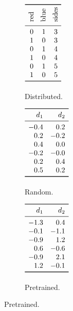 \documentclass{article}
\begin{document}
{\begin{figure}[t!]
\begin{subfigure}[t]{0.25\textwidth}
    \label{fig:reps:localist}
  \end{subfigure}
  \hfill
  \begin{subfigure}[t]{0.14\textwidth}
    \centering
    \renewcommand{\arraystretch}{1.24}
    $\begin{array}[b]{*{3}{r}}
       \toprule
       \rotatebox{90}{red} & \rotatebox{90}{blue} & \rotatebox{90}{sides}\\
       \midrule
       0 & 1 & 3   \\
       1 & 0 & 3   \\
       0 & 1 & 4   \\
       1 & 0 & 4  \\
       0 & 1 & 5  \\
       1 & 0 & 5  \\
       \bottomrule
    \end{array}$
    \caption{Distributed.}
    \label{fig:reps:symbolic}
  \end{subfigure}
  \hfill
  \begin{subfigure}[t]{0.2\textwidth}
    \centering
    \renewcommand{\arraystretch}{1.24}
    $\begin{array}[b]{rrrrr}
\toprule
 d_{1} &  d_{2} \\
\midrule
  -0.4 &    0.2 \\
   0.2 &   -0.2 \\
   0.4 &    0.0 \\
  -0.2 &   -0.0 \\
   0.2 &    0.4 \\
   0.5 &    0.2 \\
\bottomrule
    \end{array}$
    \caption{Random.}
    \label{fig:reps:random}
  \end{subfigure}
  \hfill
  \begin{subfigure}[t]{0.2\textwidth}
    \centering
    \renewcommand{\arraystretch}{1.24}
    $\begin{array}[b]{rrrrr}
\toprule
 d_{1} &  d_{2} \\
\midrule
  -1.3 &    0.4 \\
  -0.1 &   -1.1 \\
  -0.9 &    1.2 \\
   0.6 &   -0.6 \\
  -0.9 &    2.1 \\
   1.2 &   -0.1 \\
\bottomrule
    \end{array}$
    \caption{Pretrained.}
    \label{fig:reps:pretrained}
  \end{subfigure}


\end{figure}}
\end{document}
